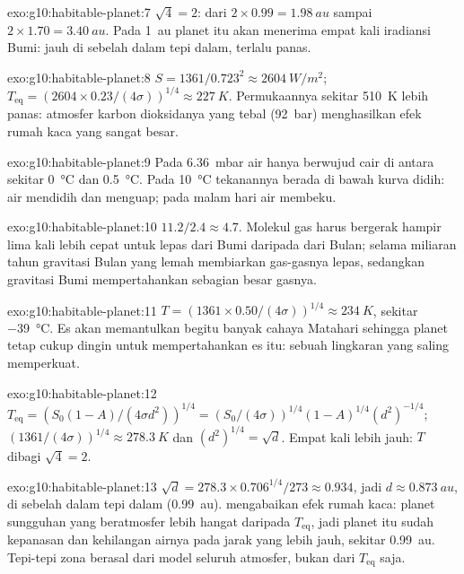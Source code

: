 \begin{solution}{exo:g10:habitable-planet:7}
$\sqrt 4 = 2$: dari $2 \times 0.99 = \qty{1.98}{au}$ sampai $2 \times 1.70 =
\qty{3.40}{au}$. Pada \qty{1}{au} planet itu akan menerima empat kali
iradiansi Bumi: jauh di sebelah dalam tepi dalam, terlalu panas.
\end{solution}

\begin{solution}{exo:g10:habitable-planet:8}
$S = 1361/0.723^2 \approx \qty{2604}{W/m^2}$;
$T_{\mathrm{eq}} = (2604 \times 0.23/(4\sigma))^{1/4} \approx \qty{227}{K}$.
Permukaannya sekitar \qty{510}{K} lebih panas: atmosfer karbon dioksidanya
yang tebal (\qty{92}{bar}) menghasilkan efek rumah kaca yang sangat besar.
\end{solution}

\begin{solution}{exo:g10:habitable-planet:9}
Pada \qty{6.36}{mbar} air hanya berwujud cair di antara sekitar
\qty{0}{\degreeCelsius} dan \qty{0.5}{\degreeCelsius}. Pada
\qty{10}{\degreeCelsius} tekanannya berada di bawah kurva didih: air mendidih
dan menguap; pada malam hari air membeku.
\end{solution}

\begin{solution}{exo:g10:habitable-planet:10}
$11.2/2.4 \approx 4.7$. Molekul gas harus bergerak hampir lima kali lebih
cepat untuk lepas dari Bumi daripada dari Bulan; selama miliaran tahun
gravitasi Bulan yang lemah membiarkan gas-gasnya lepas, sedangkan gravitasi
Bumi mempertahankan sebagian besar gasnya.
\end{solution}

\begin{solution}{exo:g10:habitable-planet:11}
$T = (1361 \times 0.50/(4\sigma))^{1/4} \approx \qty{234}{K}$, sekitar
\qty{-39}{\degreeCelsius}. Es akan memantulkan begitu banyak cahaya Matahari
sehingga planet tetap cukup dingin untuk mempertahankan es itu: sebuah
lingkaran yang saling memperkuat.
\end{solution}

\begin{solution}{exo:g10:habitable-planet:12}
$T_{\mathrm{eq}} = (S_0(1-A)/(4\sigma d^2))^{1/4} = (S_0/(4\sigma))^{1/4}
(1-A)^{1/4} (d^2)^{-1/4}$; $(1361/(4\sigma))^{1/4} \approx \qty{278.3}{K}$ dan
$(d^2)^{1/4} = \sqrt d$. Empat kali lebih jauh: $T$ dibagi $\sqrt 4 = 2$.
\end{solution}

\begin{solution}{exo:g10:habitable-planet:13}
$\sqrt d = 278.3 \times 0.706^{1/4}/273 \approx 0.934$, jadi $d \approx
\qty{0.873}{au}$, di sebelah dalam tepi dalam (\qty{0.99}{au}).  mengabaikan efek rumah kaca: planet sungguhan yang beratmosfer
lebih hangat daripada $T_{\mathrm{eq}}$, jadi planet itu sudah kepanasan dan
kehilangan airnya pada jarak yang lebih jauh, sekitar \qty{0.99}{au}.
Tepi-tepi zona berasal dari model seluruh atmosfer, bukan dari
$T_{\mathrm{eq}}$ saja.
\end{solution}

